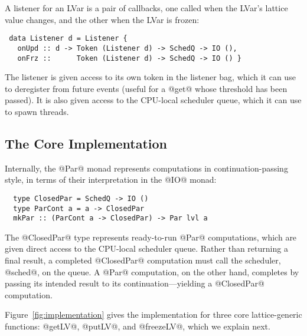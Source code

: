 A listener for an LVar is a pair of callbacks,
one called when the LVar's lattice value changes,
 and the other when the LVar is frozen:  
\begin{lstlisting}
 data Listener d = Listener {
   onUpd :: d -> Token (Listener d) -> SchedQ -> IO (),
   onFrz ::      Token (Listener d) -> SchedQ -> IO () }
\end{lstlisting}
The listener is given access to its own token in the listener bag, which it can
use to deregister from future events (useful for a @get@ whose threshold has
been passed).  It is also given access to the CPU-local scheduler queue, which
it can use to spawn threads.

\subsection{The Core Implementation}

Internally, the @Par@ monad represents computations in continuation-passing
style, in terms of their interpretation in the @IO@ monad:
\begin{lstlisting}
  type ClosedPar = SchedQ -> IO ()
  type ParCont a = a -> ClosedPar
  mkPar :: (ParCont a -> ClosedPar) -> Par lvl a
\end{lstlisting}
The @ClosedPar@ type represents ready-to-run @Par@ computations, which are given
direct access to the CPU-local scheduler queue.  Rather than returning a final
result, a completed @ClosedPar@ computation must call the scheduler, @sched@, on
the queue.  A @Par@ computation, on the other hand, completes by passing its
intended result to its continuation---yielding a @ClosedPar@ computation.

Figure~\ref{fig:implementation} gives the implementation for three core
lattice-generic functions: @getLV@, @putLV@, and @freezeLV@, which we explain next.

